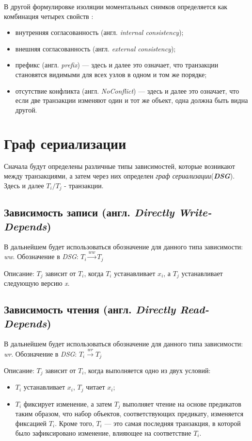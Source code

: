 \documentclass[12pt,  openany]{book}
\begin{document}
\par
В другой формулировке изоляции моментальных снимков определяется как комбинация четырех свойств \cite{cerone_et_al}:
\begin{itemize}
\item внутренняя согласованность (англ. \textit{internal consistency});
\item внешняя согласованность (англ. \textit{external consistency});
\item префикс (англ. \textit{prefix}) --- здесь и далее это означает, что транзакции становятся видимыми для всех узлов в одном и том же порядке;
\item отсутствие конфликта (англ. \textit{NoConflict}) --- здесь и далее это означает, что если две транзакции изменяют один и тот же объект, одна должна быть видна другой.
\end{itemize}

\section{Граф сериализации \cite{IsolationLevelDefinitions} \cite{IsolationLevelDefinitions2}}
Сначала будут определены различные типы зависимостей, которые возникают между транзакциями, а затем через них определен \textit{граф сериализации}(\textit{\textbf{DSG}}). 
Здесь и далее $T_i/T_j$ - транзакции.
\subsection{Зависимость записи (англ. \textit{Directly Write-Depends})}
В дальнейшем будет использоваться обозначение для данного типа зависимости: \textit{ww}. Обозначение в \textit{DSG}: $T_i  \xrightarrow{\textit{ww}} T_j$
\par
Описание: $T_j$ зависит от $T_i$, когда $T_i$ устанавливает $x_i$, а $T_j$ устанавливает следующую версию \textit{x}.

\subsection{Зависимость чтения (англ. \textit{Directly Read-Depends})}
В дальнейшем будет использоваться обозначение для данного типа зависимости: \textit{wr}. Обозначение в \textit{DSG}: $T_i  \xrightarrow{\textit{wr}} T_j$
\par
Описание: $T_j$ зависит от $T_i$,  когда выполняется одно из двух условий:
\begin{itemize}
\item $T_i$ устанавливает $x_i$, $T_j$ читает $x_i$;
\item $T_i$ фиксирует изменение, а затем $T_j$ выполняет чтение на основе предикатов таким образом, что набор объектов, соответствующих предикату, изменяется фиксацией $T_i$.   Кроме того, $T_i$ --- это самая последняя транзакция, в которой было зафиксировано изменение, влияющее на соответствие $T_i$.
\end{itemize}
\end{document}
